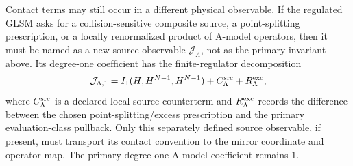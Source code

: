 \begin{example}
Contact terms may still occur in a different physical observable.  If the
regulated GLSM asks for a collision-sensitive composite source, a
point-splitting prescription, or a locally renormalized product of A-model
operators, then it must be named as a new source observable
\(\mathcal J_{\Lambda}\), not as the primary invariant above.  Its degree-one
coefficient has the finite-regulator decomposition
\begin{equation}
  \mathcal J_{\Lambda,1}
  =
  I_1(H,H^{N-1},H^{N-1})
  +
  C^{\rm src}_{\Lambda}
  +
  R^{\rm exc}_{\Lambda},
  \label{eq:cpn-degree-one-source-contact-observable}
\end{equation}
where \(C^{\rm src}_{\Lambda}\) is a declared local source counterterm and
\(R^{\rm exc}_{\Lambda}\) records the difference between the chosen
point-splitting/excess prescription and the primary evaluation-class pullback.
Only this separately defined source observable, if present, must transport its
contact convention to the mirror coordinate and operator map.  The primary
degree-one A-model coefficient remains \(1\).
\end{example}


